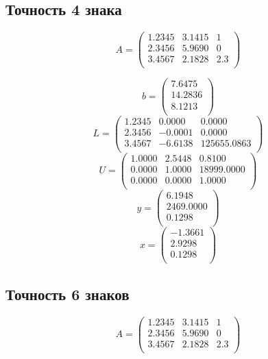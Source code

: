 \documentclass[11pt,a4paper,oneside]{article}
\begin{document}
\subsection{Точность 4 знака}

$$ A = \left(\begin{matrix}
	1.2345 & 3.1415 & 1 \\
	2.3456 & 5.9690 & 0 \\
	3.4567 & 2.1828 & 2.3 \\
\end{matrix}\right) $$

$$ b = \left(\begin{matrix}
	7.6475 \\
	14.2836 \\
	8.1213 \\
\end{matrix}\right) $$
$$L=\left(\begin{matrix} 1.2345 & 0.0000 & 0.0000\\ 2.3456 & -0.0001 & 0.0000\\ 3.4567 & -6.6138 & 125655.0863\\ \end{matrix}\right)$$
$$U=\left(\begin{matrix} 1.0000 & 2.5448 & 0.8100\\ 0.0000 & 1.0000 & 18999.0000\\ 0.0000 & 0.0000 & 1.0000\\ \end{matrix}\right)$$
$$y=\left(\begin{matrix} 6.1948\\ 2469.0000\\ 0.1298\\ \end{matrix}\right)$$
$$x=\left(\begin{matrix} -1.3661\\ 2.9298\\ 0.1298\\ \end{matrix}\right)$$

\subsection{Точность 6 знаков}

$$ A = \left(\begin{matrix}
	1.2345 & 3.1415 & 1 \\
	2.3456 & 5.9690 & 0 \\
	3.4567 & 2.1828 & 2.3 \\
\end{matrix}\right) $$
\end{document}
